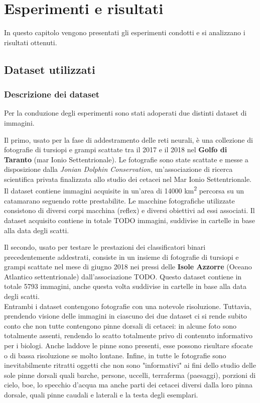 \chapter{Esperimenti e risultati}\label{esperimenti}
In questo capitolo vengono presentati gli esperimenti condotti e si analizzano i risultati ottenuti.

\section{Dataset utilizzati}
\subsection{Descrizione dei dataset}
Per la conduzione degli esperimenti sono stati adoperati due distinti dataset di immagini.

Il primo, usato per la fase di addestramento delle reti neurali, è una collezione di fotografie di tursiopi e grampi scattate tra il 2017 e il 2018 nel \textbf{Golfo di Taranto} (mar Ionio Settentrionale). Le fotografie sono state scattate e messe a disposizione dalla \textit{Jonian Dolphin Conservation}, un'associazione di ricerca scientifica privata finalizzata allo studio dei cetacei nel Mar Ionio Settentrionale. Il dataset contiene immagini acquisite in un'area di 14000 km\textsuperscript{2} percorsa su un catamarano seguendo rotte prestabilite. Le macchine fotografiche utilizzate consistono di diversi corpi macchina (reflex) e diversi obiettivi ad essi associati.
Il dataset acquisito contiene in totale TODO immagini, suddivise in cartelle in base alla data degli scatti.

Il secondo, usato per testare le prestazioni dei classificatori binari precedentemente addestrati, consiste in un insieme di fotografie di tursiopi e grampi scattate nel mese di giugno 2018 nei pressi delle \textbf{Isole Azzorre} (Oceano Atlantico settentrionale) dall'associazione TODO.
Questo dataset contiene in totale 5793 immagini, anche questa volta suddivise in cartelle in base alla data degli scatti.\\

Entrambi i dataset contengono fotografie con una notevole risoluzione. Tuttavia, prendendo visione delle immagini in ciascuno dei due dataset ci si rende subito conto che non tutte contengono pinne dorsali di cetacei: in alcune foto sono totalmente assenti, rendendo lo scatto totalmente privo di contenuto informativo per i biologi.
Anche laddove le pinne sono presenti, esse possono risultare sfocate o di bassa risoluzione se molto lontane. Infine, in tutte le fotografie sono inevitabilmente ritratti oggetti che non sono "informativi" ai fini dello studio delle sole pinne dorsali quali barche, persone, uccelli, terraferma (paesaggi), porzioni di cielo, boe, lo specchio d'acqua ma anche parti dei cetacei diversi dalla loro pinna dorsale, quali pinne caudali e laterali e la testa degli esemplari.

